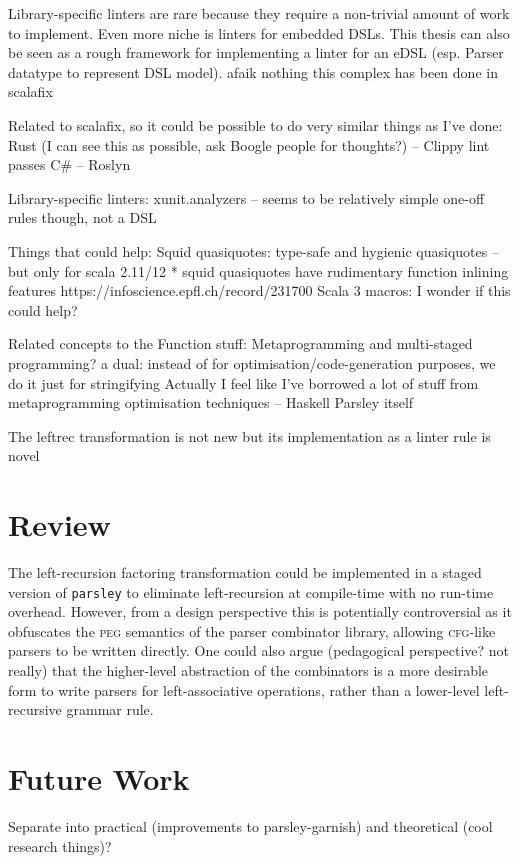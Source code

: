 \documentclass[../../main.tex]{subfiles}
\begin{document}
Library-specific linters are rare because they require a non-trivial amount of work to implement.
Even more niche is linters for embedded DSLs.
This thesis can also be seen as a rough framework for implementing a linter for an eDSL (esp. Parser datatype to represent DSL model).
afaik nothing this complex has been done in scalafix

Related to scalafix, so it could be possible to do very similar things as I've done:
Rust (I can see this as possible, ask Boogle people for thoughts?) -- Clippy lint passes %
C\# -- Roslyn

Library-specific linters:
xunit.analyzers -- seems to be relatively simple one-off rules though, not a DSL

Things that could help:
Squid quasiquotes: type-safe and hygienic quasiquotes -- but only for scala 2.11/12
* squid quasiquotes have rudimentary function inlining features https://infoscience.epfl.ch/record/231700
Scala 3 macros: I wonder if this could help?

Related concepts to the Function stuff:
Metaprogramming and multi-staged programming? a dual: instead of for optimisation/code-generation purposes, we do it just for stringifying
Actually I feel like I've borrowed a lot of stuff from metaprogramming optimisation techniques -- Haskell Parsley itself

The leftrec transformation is not new but its implementation as a linter rule is novel


\section{Review}
The left-recursion factoring transformation could be implemented in a staged version of \texttt{parsley} to eliminate left-recursion at compile-time with no run-time overhead.
However, from a design perspective this is potentially controversial as it obfuscates the \textsc{peg} semantics of the parser combinator library, allowing \textsc{cfg}-like parsers to be written directly.
One could also argue (pedagogical perspective? not really) that the higher-level abstraction of the  combinators is a more desirable form to write parsers for left-associative operations, rather than a lower-level left-recursive grammar rule.

\section{Future Work}
Separate into practical (improvements to parsley-garnish) and theoretical (cool research things)?
\end{document}
